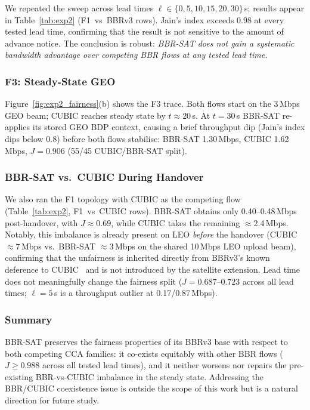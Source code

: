 \documentclass[conference]{IEEEtran}
\begin{document}
We repeated the sweep across lead times
$\ell \in \{0, 5, 10, 15, 20, 30\}\,$s; results appear in
Table~\ref{tab:exp2} (F1~vs~BBRv3 rows).
Jain's index exceeds 0.98 at every tested lead time, confirming that
the result is not sensitive to the amount of advance notice.
The conclusion is robust: \emph{BBR-SAT does not gain a systematic
bandwidth advantage over competing BBR flows at any tested lead time.}

\subsubsection{F3: Steady-State GEO}

Figure~\ref{fig:exp2_fairness}(b) shows the F3 trace.
Both flows start on the 3\,Mbps GEO beam; CUBIC reaches steady state by $t \approx 20$\,s.
At $t = 30$\,s BBR-SAT re-applies its stored GEO BDP context, causing a brief throughput dip (Jain's index dips below 0.8) before both flows stabilise: BBR-SAT 1.30\,Mbps, CUBIC 1.62\,Mbps, $J = 0.906$ (55/45 CUBIC/BBR-SAT split).

\subsubsection{BBR-SAT vs.\ CUBIC During Handover}

We also ran the F1 topology with CUBIC as the competing flow
(Table~\ref{tab:exp2}, F1~vs~CUBIC rows).
BBR-SAT obtains only 0.40--0.48\,Mbps post-handover, with $J \approx 0.69$,
while CUBIC takes the remaining $\approx$2.4\,Mbps.
Notably, this imbalance is already present on LEO \emph{before} the
handover (CUBIC $\approx 7$\,Mbps vs.\ BBR-SAT $\approx 3$\,Mbps on
the shared 10\,Mbps LEO upload beam), confirming that the unfairness is
inherited directly from BBRv3's known deference to CUBIC~\cite{cardwell2026bbr}
and is not introduced by the satellite extension.
Lead time does not meaningfully change the fairness split
($J = 0.687$--$0.723$ across all lead times; $\ell = 5$\,s is a throughput outlier at 0.17/0.87\,Mbps).

\subsubsection{Summary}

BBR-SAT preserves the fairness properties of its BBRv3 base with
respect to both competing CCA families:
it co-exists equitably with other BBR flows ($J \geq 0.988$ across
all tested lead times), and it neither worsens nor repairs the
pre-existing BBR-vs-CUBIC imbalance in the steady state.
Addressing the BBR/CUBIC coexistence issue is outside the scope of
this work but is a natural direction for future study.
\end{document}
